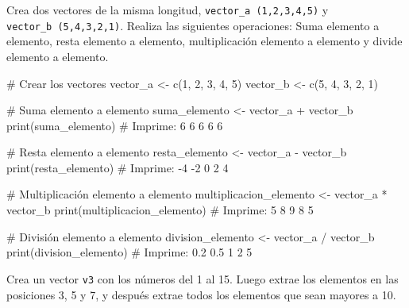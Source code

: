 \documentclass[
  letterpaper,
]{scrbook}
\newenvironment{Shaded}{\begin{snugshade}}{\end{snugshade}}
\newcommand{\CommentTok}[1]{\textcolor[rgb]{0.37,0.37,0.37}{#1}}
\newcommand{\DecValTok}[1]{\textcolor[rgb]{0.68,0.00,0.00}{#1}}
\newcommand{\FunctionTok}[1]{\textcolor[rgb]{0.28,0.35,0.67}{#1}}
\newcommand{\NormalTok}[1]{\textcolor[rgb]{0.00,0.23,0.31}{#1}}
\newcommand{\OtherTok}[1]{\textcolor[rgb]{0.00,0.23,0.31}{#1}}
\newcommand{\SpecialCharTok}[1]{\textcolor[rgb]{0.37,0.37,0.37}{#1}}
\begin{document}
Crea dos vectores de la misma longitud, \texttt{vector\_a\ (1,2,3,4,5)}
y \texttt{vector\_b\ (5,4,3,2,1)}. Realiza las siguientes operaciones:
Suma elemento a elemento, resta elemento a elemento, multiplicación
elemento a elemento y divide elemento a elemento.

\begin{Shaded}
\begin{Highlighting}[]
\CommentTok{\# Crear los vectores}
\NormalTok{vector\_a }\OtherTok{\textless{}{-}} \FunctionTok{c}\NormalTok{(}\DecValTok{1}\NormalTok{, }\DecValTok{2}\NormalTok{, }\DecValTok{3}\NormalTok{, }\DecValTok{4}\NormalTok{, }\DecValTok{5}\NormalTok{)}
\NormalTok{vector\_b }\OtherTok{\textless{}{-}} \FunctionTok{c}\NormalTok{(}\DecValTok{5}\NormalTok{, }\DecValTok{4}\NormalTok{, }\DecValTok{3}\NormalTok{, }\DecValTok{2}\NormalTok{, }\DecValTok{1}\NormalTok{)}

\CommentTok{\# Suma elemento a elemento}
\NormalTok{suma\_elemento }\OtherTok{\textless{}{-}}\NormalTok{ vector\_a }\SpecialCharTok{+}\NormalTok{ vector\_b}
\FunctionTok{print}\NormalTok{(suma\_elemento)  }\CommentTok{\# Imprime: 6 6 6 6 6}

\CommentTok{\# Resta elemento a elemento}
\NormalTok{resta\_elemento }\OtherTok{\textless{}{-}}\NormalTok{ vector\_a }\SpecialCharTok{{-}}\NormalTok{ vector\_b}
\FunctionTok{print}\NormalTok{(resta\_elemento)  }\CommentTok{\# Imprime: {-}4 {-}2 0 2 4}

\CommentTok{\# Multiplicación elemento a elemento}
\NormalTok{multiplicacion\_elemento }\OtherTok{\textless{}{-}}\NormalTok{ vector\_a }\SpecialCharTok{*}\NormalTok{ vector\_b}
\FunctionTok{print}\NormalTok{(multiplicacion\_elemento)  }\CommentTok{\# Imprime: 5 8 9 8 5}

\CommentTok{\# División elemento a elemento}
\NormalTok{division\_elemento }\OtherTok{\textless{}{-}}\NormalTok{ vector\_a }\SpecialCharTok{/}\NormalTok{ vector\_b}
\FunctionTok{print}\NormalTok{(division\_elemento)  }\CommentTok{\# Imprime: 0.2 0.5 1 2 5}
\end{Highlighting}
\end{Shaded}

Crea un vector \texttt{v3} con los números del 1 al 15. Luego extrae los
elementos en las posiciones 3, 5 y 7, y después extrae todos los
elementos que sean mayores a 10.
\end{document}
